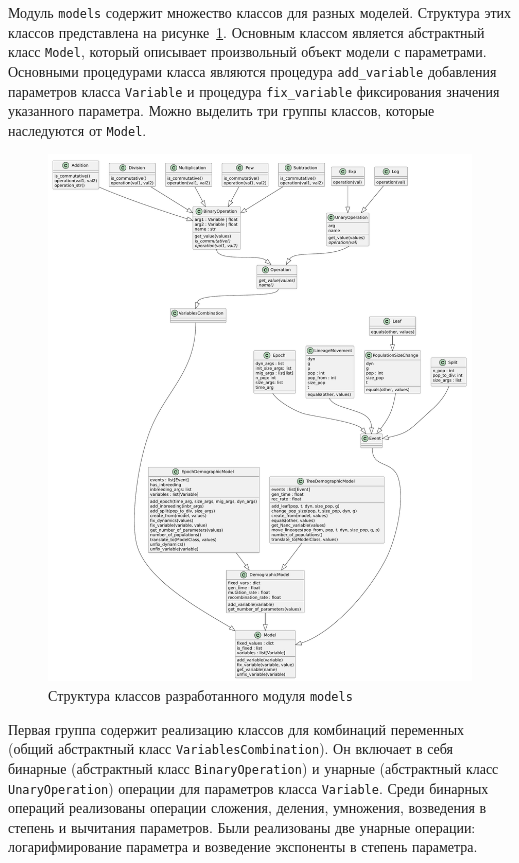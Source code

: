 Модуль \texttt{models} содержит множество классов для разных моделей.
Структура этих классов представлена на рисунке~\ref{fig:part2:model_classes}.
Основным классом является абстрактный класс \texttt{Model}, который описывает произвольный объект модели с параметрами.
Основными процедурами класса являются процедура \texttt{add\_variable} добавления параметров класса \texttt{Variable} и процедура \texttt{fix\_variable} фиксирования значения указанного параметра.
Можно выделить три группы классов, которые наследуются от \texttt{Model}.

\begin{figure}[ht]
    \centering
    \includegraphics[width=0.97\linewidth]{images/part5/models_part_classes.pdf}
    \caption{Структура классов разработанного модуля \texttt{models}}
    \label{fig:part2:model_classes}
\end{figure}

Первая группа содержит реализацию классов для комбинаций переменных (общий абстрактный класс \texttt{VariablesCombination}).
Он включает в себя бинарные (абстрактный класс \texttt{BinaryOperation}) и унарные (абстрактный класс \texttt{UnaryOperation}) операции для параметров класса \texttt{Variable}.
Среди бинарных операций реализованы операции сложения, деления, умножения, возведения в степень и вычитания параметров.
Были реализованы две унарные операции: логарифмирование параметра и возведение экспоненты в степень параметра.

